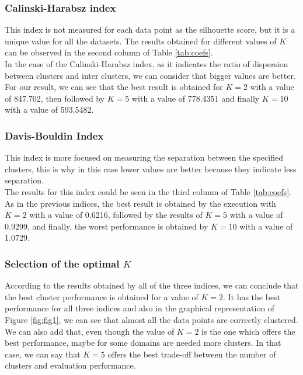 \documentclass[12pt]{article}
\begin{document}
\subsubsection{Calinski-Harabsz index}

This index is not measured for each data point as the silhouette score, but it is a unique value for all the datasets. The results obtained for different values of $K$ can be observed in the second column of Table \ref{tab:coefs}.\\

In the case of the Calinski-Harabsz index, as it indicates the ratio of dispersion between clusters and inter clusters, we can consider that bigger values are better. For our result, we can see that the best result is obtained for $K = 2$ with a value of 847.702, then followed by $K=5$ with a value of 778.4351 and finally $K=10$ with a value of 593.5482.

\subsubsection{Davis-Bouldin Index}

This index is more focused on measuring the separation between the specified clusters, this is why in this case lower values are better because they indicate less separation.\\

The results for this index could be seen in the third column of Table \ref{tab:coefs}. As in the previous indices, the best result is obtained by the execution with $K=2$ with a value of 0.6216, followed by the results of $K=5$ with a value of 0.9299, and finally, the worst performance is obtained by $K=10$ with a value of 1.0729.

\subsubsection{Selection of the optimal $K$}

According to the results obtained by all of the three indices, we can conclude that the best cluster performance is obtained for a value of $K=2$. It has the best performance for all three indices and also in the graphical representation of Figure \ref{fig:fig1}, we can see that almost all the data points are correctly clustered. \\

We can also add that, even though the value of $K=2$ is the one which offers the best performance, maybe for some domains are needed more clusters. In that case, we can say that $K=5$ offers the best trade-off between the number of clusters and evaluation performance.  
\end{document}
